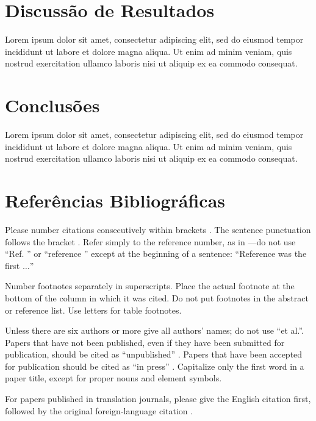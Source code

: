 \documentclass[conference]{IEEEtran}
\begin{document}
\section{Discussão de Resultados} %
Lorem ipsum dolor sit amet, consectetur adipiscing elit, sed do eiusmod tempor incididunt ut labore et dolore magna aliqua. Ut enim ad minim veniam, quis nostrud exercitation ullamco laboris nisi ut aliquip ex ea commodo consequat.

\section{Conclusões} %
Lorem ipsum dolor sit amet, consectetur adipiscing elit, sed do eiusmod tempor incididunt ut labore et dolore magna aliqua. Ut enim ad minim veniam, quis nostrud exercitation ullamco laboris nisi ut aliquip ex ea commodo consequat.

\section*{Referências Bibliográficas}

Please number citations consecutively within brackets \cite{b1}. The 
sentence punctuation follows the bracket \cite{b2}. Refer simply to the reference 
number, as in \cite{b3}---do not use ``Ref. \cite{b3}'' or ``reference \cite{b3}'' except at 
the beginning of a sentence: ``Reference \cite{b3} was the first $\ldots$''

Number footnotes separately in superscripts. Place the actual footnote at 
the bottom of the column in which it was cited. Do not put footnotes in the 
abstract or reference list. Use letters for table footnotes.

Unless there are six authors or more give all authors' names; do not use 
``et al.''. Papers that have not been published, even if they have been 
submitted for publication, should be cited as ``unpublished'' \cite{b4}. Papers 
that have been accepted for publication should be cited as ``in press'' \cite{b5}. 
Capitalize only the first word in a paper title, except for proper nouns and 
element symbols.

For papers published in translation journals, please give the English 
citation first, followed by the original foreign-language citation \cite{b6}.
\end{document}
